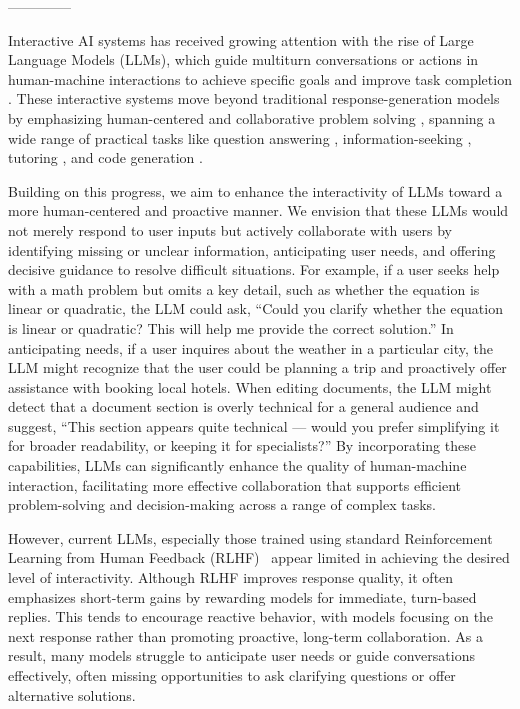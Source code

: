 
--------------



Interactive AI systems has received growing attention with the rise of Large Language Models (LLMs), which guide multiturn conversations or actions in human-machine interactions to achieve specific goals and improve task completion \citep{Wang24, proactive_survey}.
These interactive systems move beyond traditional response-generation models by emphasizing human-centered and collaborative problem solving \citep{rethinking_conv_agent, nerual_approach, clarify_survey}, spanning a wide range of practical tasks like question answering \citep{abg_coqa, pacific, m2lingual}, information-seeking \citep{inscit, clamber}, tutoring \citep{cima}, and code generation \citep{benchmark_code_generate, codegen}.

Building on this progress, we aim to enhance the interactivity of LLMs toward a more human-centered and proactive manner. We envision that these LLMs would not merely respond to user inputs but actively collaborate with users by identifying missing or unclear information, anticipating user needs, and offering decisive guidance to resolve difficult situations. For example, if a user seeks help with a math problem but omits a key detail, such as whether the equation is linear or quadratic, the LLM could ask, “Could you clarify whether the equation is linear or quadratic? This will help me provide the correct solution.” In anticipating needs, if a user inquires about the weather in a particular city, the LLM might recognize that the user could be planning a trip and proactively offer assistance with booking local hotels. When editing documents, the LLM might detect that a document section is overly technical for a general audience and suggest, “This section appears quite technical — would you prefer simplifying it for broader readability, or keeping it for specialists?” By incorporating these capabilities, LLMs can significantly enhance the quality of human-machine interaction, facilitating more effective collaboration that supports efficient problem-solving and decision-making across a range of complex tasks.

However, current LLMs, especially those trained using standard Reinforcement Learning from Human Feedback (RLHF)~\citep{rlhf} appear limited in achieving the desired level of interactivity. Although RLHF improves response quality, it often emphasizes short-term gains by rewarding models for immediate, turn-based replies. This tends to encourage reactive behavior, with models focusing on the next response rather than promoting proactive, long-term collaboration. As a result, many models struggle to anticipate user needs or guide conversations effectively, often missing opportunities to ask clarifying questions or offer alternative solutions.

